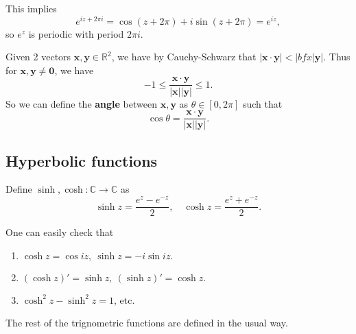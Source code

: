 This implies 
\[
    e^{iz+2\pi i}=\cos (z+2\pi)+i \sin (z+2\pi)= e^{iz},
\]
so $e^z$ is periodic with period $ 2\pi i $.

\begin{remark}
    Given 2 vectors $ \mathbf{x},\mathbf{y}\in \mathbb{R}^{2} $, we have by Cauchy-Schwarz that $ |\mathbf{x} \cdot \mathbf{y}|<|bfx|\mathbf{y}| $. Thus for $ \mathbf{x},\mathbf{y}\neq \mathbf{0} $, we have 
    \[
        -1\le \frac{\mathbf{x}\cdot\mathbf{y}}{|\mathbf{x}||\mathbf{y}|}\le 1.
    \]
    So we can define the \textbf{angle} between $\mathbf{x},\mathbf{y}$ as $ \theta\in [0,2\pi] $ such that 
    \[
        \cos \theta=\frac{\mathbf{x}\cdot\mathbf{y}}{|\mathbf{x}||\mathbf{y}|}.
    \]
\end{remark}

\subsection{Hyperbolic functions}
\begin{definition}
    Define $ \sinh ,\cosh : \mathbb{C} \to \mathbb{C} $ as 
    \[
        \sinh z = \frac{e^z-e^{-z}}{2},\quad \cosh z = \frac{e^z+e^{-z}}{2}.
    \]
\end{definition}
One can easily check that 
\begin{sprop}
    \begin{enumerate}
        \item $ \cosh z = \cos iz,\ \sinh z = -i \sin iz. $
        \item $ (\cosh z)'=\sinh z,\ (\sinh z)'=\cosh z .$
        \item $ \cosh^2 z-\sinh^2 z=1 $, etc.
    \end{enumerate}
\end{sprop}

The rest of the trignometric functions are defined in the usual way.